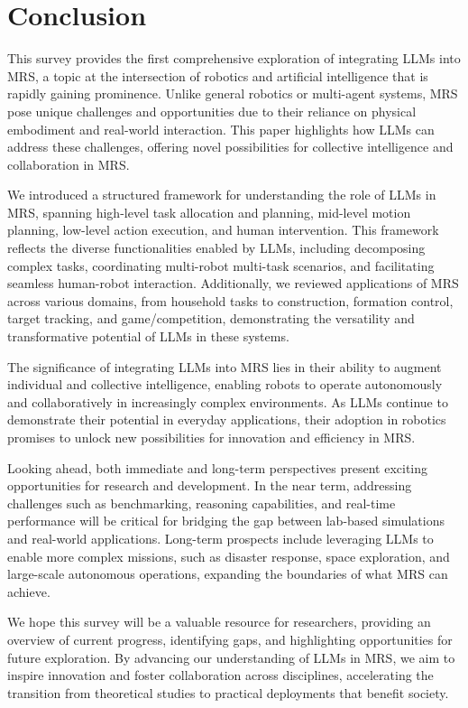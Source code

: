 \section{Conclusion}\label{sec:8-conclusion}
This survey provides the first comprehensive exploration of integrating LLMs into MRS, a topic at the intersection of robotics and artificial intelligence that is rapidly gaining prominence. Unlike general robotics or multi-agent systems, MRS pose unique challenges and opportunities due to their reliance on physical embodiment and real-world interaction. This paper highlights how LLMs can address these challenges, offering novel possibilities for collective intelligence and collaboration in MRS.

We introduced a structured framework for understanding the role of LLMs in MRS, spanning high-level task allocation and planning, mid-level motion planning, low-level action execution, and human intervention. This framework reflects the diverse functionalities enabled by LLMs, including decomposing complex tasks, coordinating multi-robot multi-task scenarios, and facilitating seamless human-robot interaction. Additionally, we reviewed applications of MRS across various domains, from household tasks to construction, formation control, target tracking, and game/competition, demonstrating the versatility and transformative potential of LLMs in these systems.

The significance of integrating LLMs into MRS lies in their ability to augment individual and collective intelligence, enabling robots to operate autonomously and collaboratively in increasingly complex environments. As LLMs continue to demonstrate their potential in everyday applications, their adoption in robotics promises to unlock new possibilities for innovation and efficiency in MRS.

Looking ahead, both immediate and long-term perspectives present exciting opportunities for research and development. In the near term, addressing challenges such as benchmarking, reasoning capabilities, and real-time performance will be critical for bridging the gap between lab-based simulations and real-world applications. Long-term prospects include leveraging LLMs to enable more complex missions, such as disaster response, space exploration, and large-scale autonomous operations, expanding the boundaries of what MRS can achieve.

We hope this survey will be a valuable resource for researchers, providing an overview of current progress, identifying gaps, and highlighting opportunities for future exploration. By advancing our understanding of LLMs in MRS, we aim to inspire innovation and foster collaboration across disciplines, accelerating the transition from theoretical studies to practical deployments that benefit society.

